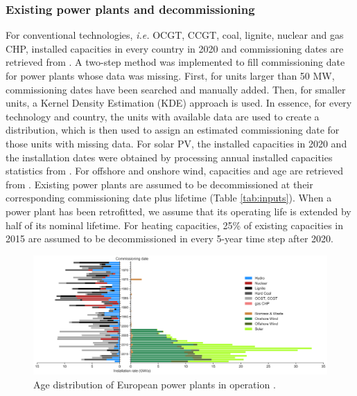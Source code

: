 \documentclass[3p]{elsarticle} %
\begin{document}
\subsubsection{Existing power plants and decommissioning}

For conventional technologies, \textit{i.e.} OCGT, CCGT, coal, lignite, nuclear and gas CHP, installed capacities in every country in 2020 and commissioning dates are retrieved from \cite{powerplantmatching}. 
A two-step method was implemented to fill commissioning date for power plants whose data was missing. First, for units larger than 50 MW, commissioning dates have been searched and manually added. Then, for smaller units, a Kernel Density Estimation (KDE) approach is used. In essence, for every technology and country, the units with available data are used to create a distribution, which is then used to assign an estimated commissioning date for those units with missing data. For solar PV, the installed capacities in 2020 and the installation dates were obtained by processing annual installed capacities statistics from \cite{IRENA_2019}. For offshore and onshore wind, capacities and age are retrieved from \cite{thewindpower}. Existing power plants are assumed to be decommissioned at their corresponding commissioning date plus lifetime (Table \ref{tab:inputs}). When a power plant has been retrofitted, we assume that its operating life is extended by half of its nominal lifetime. 
For heating capacities, 25\% of existing capacities in 2015 are assumed to be decommissioned in every 5-year time step after 2020.

\begin{figure}[!h]
\centering
\includegraphics[width=\textwidth]{../figures/age_distribution_existing.png}
\caption{Age distribution of European power plants in operation \cite{powerplantmatching, IRENA_2019}.} 
\end{figure}
\end{document}
